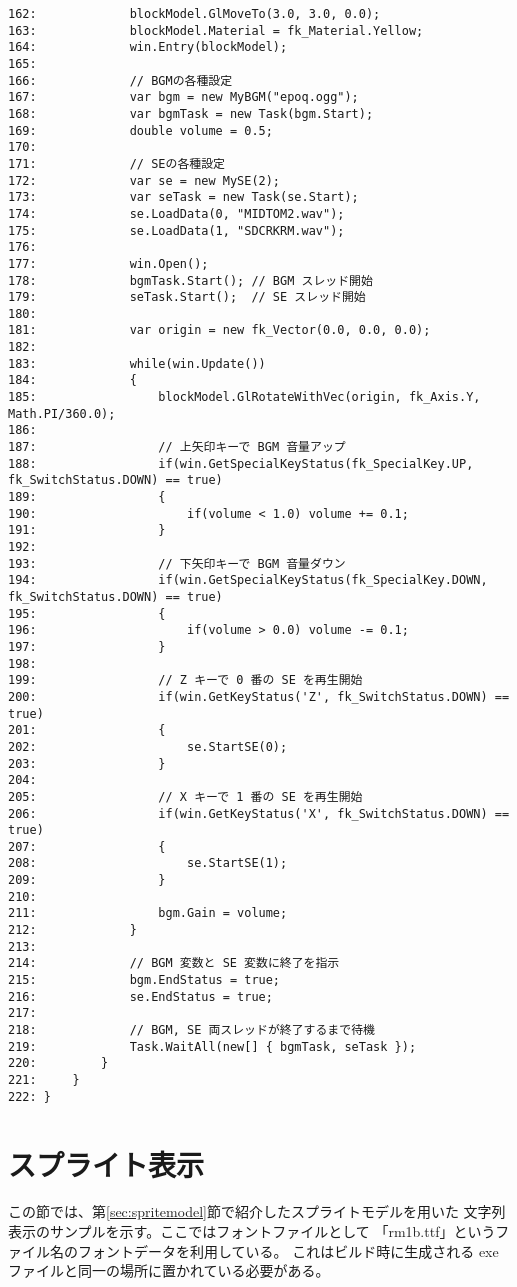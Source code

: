 \begin{breakbox}
\begin{small}
\begin{verbatim}
162:             blockModel.GlMoveTo(3.0, 3.0, 0.0);
163:             blockModel.Material = fk_Material.Yellow;
164:             win.Entry(blockModel);
165: 
166:             // BGMの各種設定
167:             var bgm = new MyBGM("epoq.ogg");
168:             var bgmTask = new Task(bgm.Start);
169:             double volume = 0.5;
170:             
171:             // SEの各種設定
172:             var se = new MySE(2);
173:             var seTask = new Task(se.Start);
174:             se.LoadData(0, "MIDTOM2.wav");
175:             se.LoadData(1, "SDCRKRM.wav");
176: 
177:             win.Open();
178:             bgmTask.Start(); // BGM スレッド開始
179:             seTask.Start();  // SE スレッド開始
180: 
181:             var origin = new fk_Vector(0.0, 0.0, 0.0);
182: 
183:             while(win.Update())
184:             {
185:                 blockModel.GlRotateWithVec(origin, fk_Axis.Y, Math.PI/360.0);
186: 
187:                 // 上矢印キーで BGM 音量アップ
188:                 if(win.GetSpecialKeyStatus(fk_SpecialKey.UP, fk_SwitchStatus.DOWN) == true)
189:                 {
190:                     if(volume < 1.0) volume += 0.1;
191:                 }
192: 
193:                 // 下矢印キーで BGM 音量ダウン
194:                 if(win.GetSpecialKeyStatus(fk_SpecialKey.DOWN, fk_SwitchStatus.DOWN) == true)
195:                 {
196:                     if(volume > 0.0) volume -= 0.1;
197:                 }
198: 
199:                 // Z キーで 0 番の SE を再生開始
200:                 if(win.GetKeyStatus('Z', fk_SwitchStatus.DOWN) == true)
201:                 {
202:                     se.StartSE(0);
203:                 }
204: 
205:                 // X キーで 1 番の SE を再生開始
206:                 if(win.GetKeyStatus('X', fk_SwitchStatus.DOWN) == true)
207:                 {
208:                     se.StartSE(1);
209:                 }
210: 
211:                 bgm.Gain = volume;
212:             }
213: 
214:             // BGM 変数と SE 変数に終了を指示
215:             bgm.EndStatus = true;
216:             se.EndStatus = true;
217: 
218:             // BGM, SE 両スレッドが終了するまで待機
219:             Task.WaitAll(new[] { bgmTask, seTask });
220:         }
221:     }
222: }
\end{verbatim}
\end{small}
\end{breakbox}

\section{スプライト表示}
この節では、第\ref{sec:spritemodel}節で紹介したスプライトモデルを用いた
文字列表示のサンプルを示す。ここではフォントファイルとして
「rm1b.ttf」というファイル名のフォントデータを利用している。
これはビルド時に生成される exe ファイルと同一の場所に置かれている必要がある。

